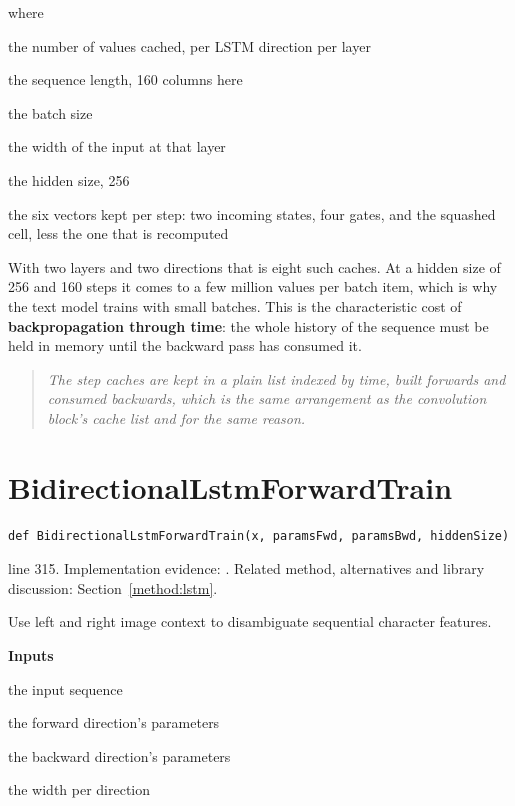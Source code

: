 \noindent where
\begin{description}[leftmargin=2.4em,style=nextline,font=\normalfont\ttfamily]\setlength\itemsep{1pt}
  \item[{$\mathrm{memory}$}] \normalfont the number of values cached, per LSTM direction per layer
  \item[{$T$}] \normalfont the sequence length, 160 columns here
  \item[{$B$}] \normalfont the batch size
  \item[{$\mathrm{inputSize}$}] \normalfont the width of the input at that layer
  \item[{$H$}] \normalfont the hidden size, 256
  \item[{$6H$}] \normalfont the six vectors kept per step: two incoming states, four gates, and the squashed cell, less the one that is recomputed
\end{description}
With two layers and two directions that is eight such caches. At a hidden size of 256 and 160 steps it comes to a few million values per batch item, which is why the text model trains with small batches. This is the characteristic cost of \textbf{backpropagation through time}: the whole history of the sequence must be held in memory until the backward pass has consumed it.


\begin{quote}\small\itshape The step caches are kept in a plain list indexed by time, built forwards and consumed backwards, which is the same arrangement as the convolution block's cache list and for the same reason.\end{quote}


\section{BidirectionalLstmForwardTrain}\label{fn:train:BidirectionalLstmForwardTrain}
\begin{lstlisting}[style=sig]
def BidirectionalLstmForwardTrain(x, paramsFwd, paramsBwd, hiddenSize)
\end{lstlisting}
 line 315. Implementation evidence: \cite{code2026}. Related method, alternatives and library discussion: Section~\ref{method:lstm}.


Use left and right image context to disambiguate sequential character features.




\noindent\textbf{Inputs}
\begin{description}[leftmargin=2.2em,style=nextline,font=\normalfont\ttfamily]\setlength\itemsep{1pt}
  \item[{x}] \normalfont the input sequence
  \item[{paramsFwd}] \normalfont the forward direction's parameters
  \item[{paramsBwd}] \normalfont the backward direction's parameters
  \item[{hiddenSize}] \normalfont the width per direction
\end{description}


